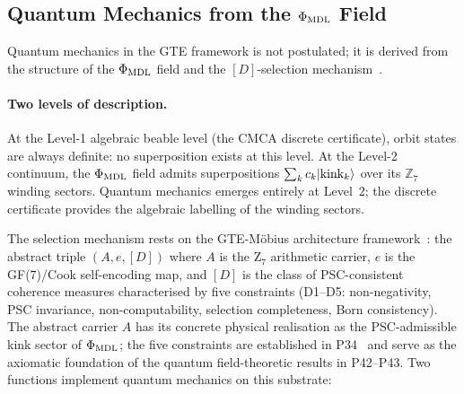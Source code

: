 \subsection{Quantum Mechanics from the \texorpdfstring{$\Phi_{\rm MDL}$}{Phi\_MDL} Field}
\label{subsec:overview-qm}

Quantum mechanics in the GTE framework is not postulated; it is derived from the
structure of the $\Phi_{\rm MDL}$ field and the $[D]$-selection
mechanism~\cite{SpivackQMFromR110,SpivackPhiMDLField}.

\paragraph{Two levels of description.}
At the Level-1 algebraic beable level (the CMCA discrete certificate), orbit states
are always definite: no superposition exists at this level.  At the Level-2 continuum,
the $\Phi_{\rm MDL}$ field admits superpositions
$\sum_k c_k\lvert{\rm kink}_k\rangle$ over its $\mathbb{Z}_7$ winding sectors.
Quantum mechanics emerges entirely at Level~2; the discrete certificate provides
the algebraic labelling of the winding sectors.

The selection mechanism rests on the GTE-Möbius architecture framework~\cite{SpivackGTEMobius}: the abstract triple $(A, e, [D])$ where $A$ is the Z$_7$ arithmetic carrier, $e$ is the GF(7)/Cook self-encoding map, and $[D]$ is the class of PSC-consistent coherence measures characterised by five constraints (D1--D5: non-negativity, PSC invariance, non-computability, selection completeness, Born consistency). The abstract carrier $A$ has its concrete physical realisation as the PSC-admissible kink sector of $\Phi_{\rm MDL}$; the five constraints are established in P34~\cite{SpivackGTEMobius} and serve as the axiomatic foundation of the quantum field-theoretic results in P42--P43. Two functions implement quantum mechanics on this substrate:

